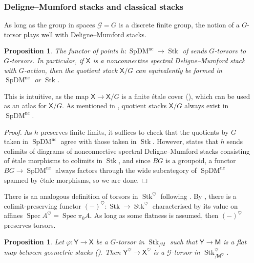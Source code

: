 \documentclass[11pt, a4paper]{article}
\newcommand{\nc}{{\mathrm{nc}}}
\DeclareMathOperator{\Spec}{Spec}
\newcommand{\1}{\mathbf{1}}
\DeclareMathOperator{\Stk}{Stk}
\DeclareMathOperator{\SpDM}{SpDM}
\newcommand{\calG}{\mathcal{G}}
\newcommand{\M}{\mathsf{M}}
\newcommand{\X}{\mathsf{X}}
\newcommand{\Y}{\mathsf{Y}}
\theoremstyle{plain}
\newtheorem{prop}[equation]{Proposition}
\theoremstyle{definition}
\theoremstyle{remark}\numberwithin{equation}{section}
\begin{document}
\subsubsection{Deligne--Mumford stacks and classical stacks}
As long as the group in spaces $\calG = G$ is a discrete finite group, the notion of a $G$-torsor plays well with Deligne--Mumford stacks.

\begin{prop}\label{pr:dm_and_torsors}
    The functor of points $h \colon \SpDM^\nc \to \Stk$ of \cite[Pr.3.2.2.2]{reconstruction} sends $G$-torsors to $G$-torsors. In particular, if $\X$ is a nonconnective spectral Deligne--Mumford stack with $G$-action, then the quotient stack $\X/G$ can equivalently be formed in $\SpDM^\nc$ or $\Stk$.
\end{prop}

This is intuitive, as the map $\X \to \X/G$ is a finite étale cover (), which can be used as an atlas for $\X/G$. As mentioned in \cite[Not.3.2.2.3]{sag}, quotient stacks $\X/G$ always exist in $\SpDM^\nc$.

\begin{proof}
    As $h$ preserves finite limits, it suffices to check that the quotients by $G$ taken in $\SpDM^\nc$ agree with those taken in $\Stk$. However, \cite[Pr.3.2.2.2(2)]{reconstruction} states that $h$ sends colimits of diagrams of nonconnective spectral Deligne--Mumford stacks consisting of étale morphisms to colimits in $\Stk$, and since $BG$ is a groupoid, a functor $BG \to \SpDM^\nc$ always factors through the wide subcategory of $\SpDM^\nc$ spanned by étale morphisms, so we are done.
\end{proof}

There is an analogous definition of torsors in $\Stk^\heartsuit$ following . By \cite[Df.3.1.1.7]{reconstruction}, there is a colimit-preserving functor $(-)^\heartsuit \colon \Stk \to \Stk^{\heartsuit}$ characterised by its value on affines $\Spec A^\heartsuit = \Spec \pi_0 A$. As long as some flatness is assumed, then $(-)^\heartsuit$ preserves torsors.

\begin{prop}\label{pr:torsors_and_hearts}
    Let $\varphi\colon \Y \to \X$ be a $G$-torsor in $\Stk_{/\M}$ such that $\Y \to \M$ is a flat map between geometric stacks (\cite[Df.3.4.2.1]{reconstruction}). Then $\Y^\heartsuit \to \X^\heartsuit$ is a $\calG$-torsor in $\Stk_{/\M^\heartsuit}^\heartsuit$.
\end{prop}
\end{document}
